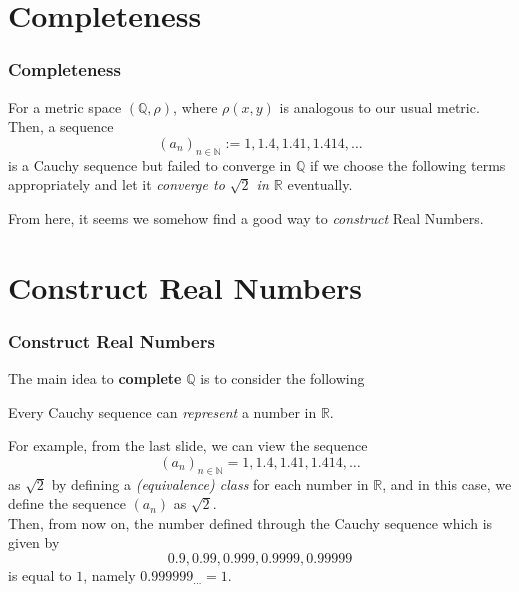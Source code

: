 \documentclass[12pt, t]{beamer}
\renewcommand{\emph}[1]{{\color{Turquoise3}\textsl{#1}}}
\begin{document}
\section{Completeness}
\begin{frame}
    \frametitle{Completeness}
    For a metric space $(\mathbb{Q},\rho)$, where $\rho(x,y)$ is analogous to our usual metric. Then, a sequence
    \begin{equation*}
        (a_n)_{n\in\mathbb{N}}:=1,1.4,1.41,1.414,\dots
    \end{equation*}
    is a Cauchy sequence but failed to converge in $\mathbb{Q}$ if we choose the following terms appropriately and let it \emph{converge
        to $\sqrt{2}$ in $\mathbb{R}$} eventually.\\
    \vspace{0,5em}

    From here, it seems we somehow find a good way to \emph{construct} Real Numbers.
\end{frame}

\section{Construct Real Numbers}
\begin{frame}
    \frametitle{Construct Real Numbers}
    The main idea to \textbf{complete} $\mathbb{Q}$ is to consider the following\\
    \begin{center}
        Every Cauchy sequence can \emph{represent} a number in $\mathbb{R}$.
    \end{center}

    For example, from the last slide, we can view the sequence
    \begin{equation*}
        (a_n)_{n\in\mathbb{N}}=1,1.4,1.41,1.414,\dots
    \end{equation*}
    as $\sqrt{2}$ by defining a \emph{(equivalence) class} for each number in $\mathbb{R}$, and in this case, we define the sequence $(a_n)$ as $\sqrt{2}$.\\
    \vspace{0.5em}
    Then, from now on, the number defined through the Cauchy sequence which is given by
    \begin{equation*}
        0.9,0.99,0.999,0.9999,0.99999
    \end{equation*}
    is equal to $1$, namely $0.999999_{\dots}=1$.
\end{frame}
\end{document}
